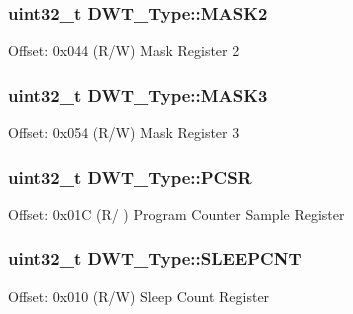 \subsubsection[{\texorpdfstring{M\+A\+S\+K2}{MASK2}}]{ uint32\+\_\+t D\+W\+T\+\_\+\+Type\+::\+M\+A\+S\+K2}\hypertarget{struct_d_w_t___type_a8ecdc8f0d917dac86b0373532a1c0e2e}{}\label{struct_d_w_t___type_a8ecdc8f0d917dac86b0373532a1c0e2e}
Offset\+: 0x044 (R/W) Mask Register 2 
\subsubsection[{\texorpdfstring{M\+A\+S\+K3}{MASK3}}]{ uint32\+\_\+t D\+W\+T\+\_\+\+Type\+::\+M\+A\+S\+K3}\hypertarget{struct_d_w_t___type_ae3f01137a8d28c905ddefe7333547fba}{}\label{struct_d_w_t___type_ae3f01137a8d28c905ddefe7333547fba}
Offset\+: 0x054 (R/W) Mask Register 3 
\subsubsection[{\texorpdfstring{P\+C\+SR}{PCSR}}]{ uint32\+\_\+t D\+W\+T\+\_\+\+Type\+::\+P\+C\+SR}\hypertarget{struct_d_w_t___type_abc5ae11d98da0ad5531a5e979a3c2ab5}{}\label{struct_d_w_t___type_abc5ae11d98da0ad5531a5e979a3c2ab5}
Offset\+: 0x01C (R/ ) Program Counter Sample Register 
\subsubsection[{\texorpdfstring{S\+L\+E\+E\+P\+C\+NT}{SLEEPCNT}}]{ uint32\+\_\+t D\+W\+T\+\_\+\+Type\+::\+S\+L\+E\+E\+P\+C\+NT}\hypertarget{struct_d_w_t___type_a8afd5a4bf994011748bc012fa442c74d}{}\label{struct_d_w_t___type_a8afd5a4bf994011748bc012fa442c74d}
Offset\+: 0x010 (R/W) Sleep Count Register 

